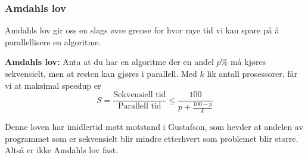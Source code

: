 \subsubsection{Amdahls lov}
\label{sec:amdahl}

Amdahls lov gir oss en slags øvre grense for hvor mye tid vi kan spare på å
parallellisere en algoritme.
\begin{teorem}\textbf{Amdahls lov: } 
  Anta at du har en algoritme der en andel
  $p\%$ må kjøres sekvensielt, men at resten kan gjøres i parallell.
  Med $k$ lik antall prosessorer, får vi at maksimal speedup er
  \[
    S = \frac{\text{Sekvensiell tid}}{\text{Parallell tid}} \leq \frac{100}{p + \frac{100 - p}{k}}
  \]
\end{teorem}

Denne loven har imidlertid møtt motstand i Gustafson, som hevder at andelen av
programmet som er sekvensielt blir mindre etterhvert som problemet blir større.
Altså er ikke Amdahls lov fast.

